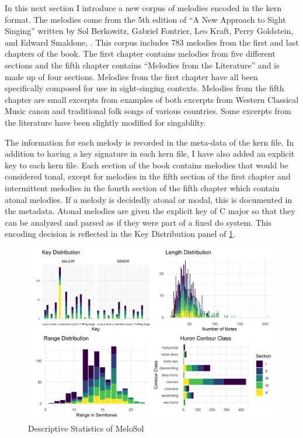 \documentclass[]{book}
\begin{document}
In this next section I introduce a new corpus of melodies encoded in the kern format.
The melodies come from the 5th edition of ``A New Approach to Sight Singing'' written by Sol Berkowitz, Gabriel Fontrier, Leo Kraft, Perry Goldstein, and Edward Smaldone, \citep{berkowitzNewApproachSight2011}.
This corpus includes 783 melodies from the first and last chapters of the book.
The first chapter contains melodies from five different sections and the fifth chapter contains ``Melodies from the Literature'' and is made up of four sections.
Melodies from the first chapter have all been specifically composed for use in sight-singing contexts.
Melodies from the fifth chapter are small excerpts from examples of both excerpts from Western Classical Music canon and traditional folk songs of various countries.
Some excerpts from the literature have been slightly modified for singablilty.

The information for each melody is recorded in the meta-data of the kern file.
In addition to having a key signature in each kern file, I have also added an explicit key to each kern file.
Each section of the book contains melodies that would be considered tonal, except for melodies in the fifth section of the first chapter and intermittent melodies in the fourth section of the fifth chapter which contain atonal melodies.
If a melody is decidedly atonal or modal, this is documented in the metadata.
Atonal melodies are given the explicit key of C major so that they can be analyzed and parsed as if they were part of a fixed do system.
This encoding decision is reflected in the Key Distribution panel of \ref{fig:melosoldescriptivepanel}.

\begin{figure}

{\centering \includegraphics[width=1\linewidth]{img/melosol_descript_panel} 

}

\caption{Descriptive Statistics of MeloSol}\label{fig:melosoldescriptivepanel}
\end{figure}
\end{document}
